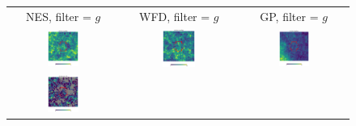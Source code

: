 \documentclass[preprintm,linenumbers]{aastex631}
\begin{document}
  

  	\begin{figure}
			\centering
			\begin{tabular}{  c c c}
                 NES, filter = $g$ & WFD, filter = $g$ & GP, filter = $g$ \\
				\includegraphics[width=0.3\textwidth]{results/skymaps_cutout/skymaps_cutout_first_year_one_snap_v4_0_10yrs_db_noDD_noTwi_nside-256_CountMetric_g_NES_noDD_noTwi.pdf} &
				\includegraphics[width=0.3\textwidth]{results/skymaps_cutout/skymaps_cutout_first_year_one_snap_v4_0_10yrs_db_noDD_noTwi_nside-256_CountMetric_g_WFD_noDD_noTwi.pdf} &
				\includegraphics[width=0.3\textwidth]{results/skymaps_cutout/skymaps_cutout_first_year_one_snap_v4_0_10yrs_db_noDD_noTwi_nside-256_CountMetric_g_GP_noDD_noTwi.pdf} \\
				\includegraphics[width=0.3\textwidth]{results/skymaps_cutout/skymaps_cutout_first_year_one_snap_v4_0_10yrs_db_noDD_noTwi_tscale-7_nside-256_doAllTemplateMetrics_reduceCount_g_NES_noDD_noTwi.pdf} &

\end{tabular}
\end{figure}
\end{document}
